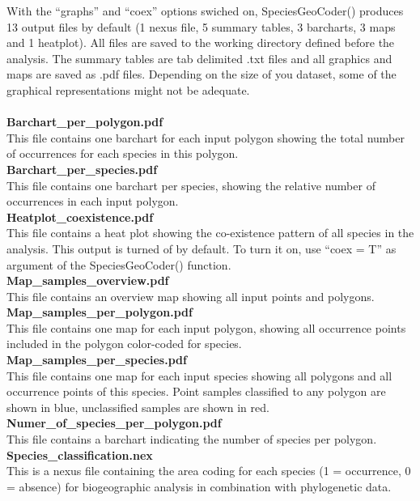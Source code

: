 \documentclass[a4paper,titlepage,11pt]{scrreprt}
\begin{document}
With the ``graphs'' and ``coex'' options swiched on, SpeciesGeoCoder() produces 13 output files by default (1 nexus file, 5 summary tables, 3 barcharts, 3 maps and 1 heatplot). All files are saved to the working directory defined before the analysis. The summary tables are tab delimited .txt files and all graphics and maps are saved as .pdf files. Depending on the size of you dataset, some of the graphical representations might not be adequate. \\
\\
\textbf{Barchart\_per\_polygon.pdf}\\
This file contains one barchart for each input polygon showing the total number of occurrences for each species in this polygon.\\
\textbf{Barchart\_per\_species.pdf}\\
This file contains one barchart per species, showing the relative number of occurrences in each input polygon.\\
\textbf{Heatplot\_coexistence.pdf}\\
This file contains a heat plot showing the co-existence pattern of all species in the analysis. This output is turned of by default. To turn it on, use  ``coex = T'' as argument of the SpeciesGeoCoder() function.\\
\textbf{Map\_samples\_overview.pdf}\\
This file contains  an overview map showing all input points and polygons.\\
\textbf{Map\_samples\_per\_polygon.pdf}\\
This file contains one map for each input polygon, showing all occurrence points included in the polygon color-coded for species.\\
\textbf{Map\_samples\_per\_species.pdf}\\
This file contains one map  for each input species showing all polygons and all occurrence points of this species. Point samples classified to any polygon are shown in blue, unclassified samples are shown in red.\\
\textbf{Numer\_of\_species\_per\_polygon.pdf}\\
This file contains a barchart indicating the number of species per polygon.\\
\textbf{Species\_classification.nex}\\
This is a nexus file containing the area coding for each species (1 = occurrence, 0 = absence) for biogeographic analysis in combination with phylogenetic data.\\
\end{document}
